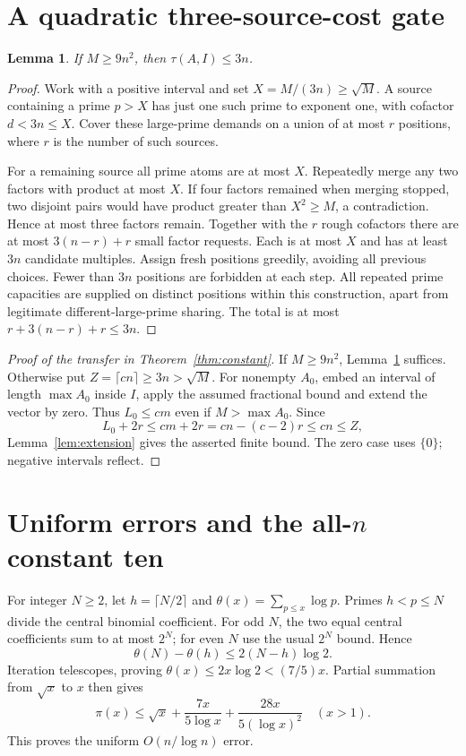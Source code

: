 \documentclass[11pt,a4paper]{article}
\newtheorem{lemma}[theorem]{Lemma}
\begin{document}
\section{A quadratic three-source-cost gate}
\begin{lemma}\label{lem:3n}
If $M\ge9n^2$, then $\tau(A,I)\le3n$.
\end{lemma}
\begin{proof}
Work with a positive interval and set $X=M/(3n)\ge\sqrt M$.
A source containing a prime $p>X$ has just one such prime to exponent
one, with cofactor $d<3n\le X$. Cover these large-prime demands on a
union of at most $r$ positions, where $r$ is the number of such sources.

For a remaining source all prime atoms are at most $X$. Repeatedly merge
any two factors with product at most $X$. If four factors remained when
merging stopped, two disjoint pairs would have product greater than
$X^2\ge M$, a contradiction. Hence at most three factors remain.
Together with the $r$ rough cofactors there are at most
$3(n-r)+r$ small factor requests. Each is at most $X$ and has at least
$3n$ candidate multiples. Assign fresh positions greedily, avoiding all
previous choices. Fewer than $3n$ positions are forbidden at each step.
All repeated prime capacities are supplied on distinct positions within
this construction, apart from legitimate different-large-prime sharing.
The total is at most $r+3(n-r)+r\le3n$.
\end{proof}

\begin{proof}[Proof of the transfer in Theorem~\ref{thm:constant}]
If $M\ge9n^2$, Lemma~\ref{lem:3n} suffices. Otherwise put
$Z=\lceil cn\rceil\ge3n>\sqrt M$. For nonempty $A_0$, embed an interval
of length $\max A_0$ inside $I$, apply the assumed fractional bound
and extend the vector by zero. Thus $L_0\le cm$ even if $M>\max A_0$.
Since
\[
 L_0+2r\le cm+2r=cn-(c-2)r\le cn\le Z,
\]
Lemma~\ref{lem:extension} gives the asserted finite bound.
The zero case uses $\{0\}$; negative intervals reflect.
\end{proof}

\section{Uniform errors and the all-\(n\) constant ten}
For integer $N\ge2$, let $h=\lceil N/2\rceil$ and
$\theta(x)=\sum_{p\le x}\log p$. Primes $h<p\le N$ divide the central
binomial coefficient. For odd $N$, the two equal central coefficients
sum to at most $2^N$; for even $N$ use the usual $2^N$ bound.
Hence
\[
 \theta(N)-\theta(h)\le2(N-h)\log2.
\]
Iteration telescopes, proving
$\theta(x)\le2x\log2<(7/5)x$.
Partial summation from $\sqrt x$ to $x$ then gives
\[
 \pi(x)\le\sqrt x+\frac{7x}{5\log x}
                    +\frac{28x}{5(\log x)^2}\quad(x>1).
 \tag{P}
\]
This proves the uniform $O(n/\log n)$ error.
\end{document}
